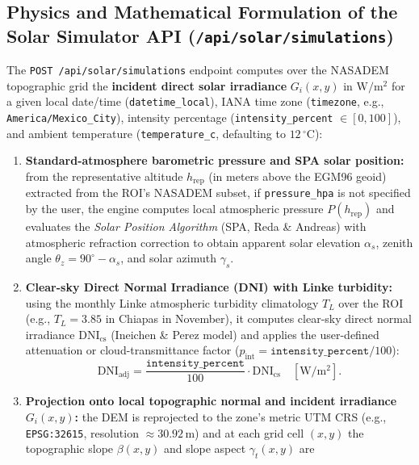 \documentclass[11pt,a4paper]{article}
\newcommand{\unit}[1]{\mathrm{#1}}
\begin{document}
\subsection{Physics and Mathematical Formulation of the Solar Simulator API (\texttt{/api/solar/simulations})}

The \texttt{POST /api/solar/simulations} endpoint computes over the NASADEM topographic grid the
\textbf{incident direct solar irradiance} $G_i(x,y)$ in $\unit{W/m^2}$ for a given local date/time
(\texttt{datetime\_local}), IANA time zone (\texttt{timezone}, e.g., \texttt{America/Mexico\_City}), intensity
percentage (\texttt{intensity\_percent} $\in [0, 100]$), and ambient temperature (\texttt{temperature\_c},
defaulting to $12\,^\circ\unit{C}$):

\begin{enumerate}
  \item \textbf{Standard-atmosphere barometric pressure and SPA solar position:} from the representative altitude
        $h_{\mathrm{rep}}$ (in meters above the EGM96 geoid) extracted from the ROI's NASADEM subset, if
        \texttt{pressure\_hpa} is not specified by the user, the engine computes local atmospheric pressure
        $P(h_{\mathrm{rep}})$ and evaluates the \emph{Solar Position Algorithm} (SPA, Reda \& Andreas) with
        atmospheric refraction correction to obtain apparent solar elevation $\alpha_s$, zenith angle
        $\theta_z = 90^\circ - \alpha_s$, and solar azimuth $\gamma_s$.
  \item \textbf{Clear-sky Direct Normal Irradiance (DNI) with Linke turbidity:} using the monthly Linke
        atmospheric turbidity climatology $T_L$ over the ROI (e.g., $T_L = 3.85$ in Chiapas in November), it
        computes clear-sky direct normal irradiance $\mathrm{DNI}_{\mathrm{cs}}$ (Ineichen \& Perez model) and
        applies the user-defined attenuation or cloud-transmittance factor
        ($p_{\mathrm{int}} = \texttt{intensity\_percent}/100$):
        \begin{equation}
          \mathrm{DNI}_{\mathrm{adj}} = \frac{\texttt{intensity\_percent}}{100} \cdot \mathrm{DNI}_{\mathrm{cs}}
          \quad [\unit{W/m^2}].
          \label{eq:solar-dni-adj}
        \end{equation}
  \item \textbf{Projection onto local topographic normal and incident irradiance $G_i(x,y)$:} the DEM is
        reprojected to the zone's metric UTM CRS (e.g., \texttt{EPSG:32615}, resolution $\approx 30.92\,\unit{m}$)
        and at each grid cell $(x,y)$ the topographic slope $\beta(x,y)$ and slope aspect $\gamma_t(x,y)$ are

\end{enumerate}
\end{document}
